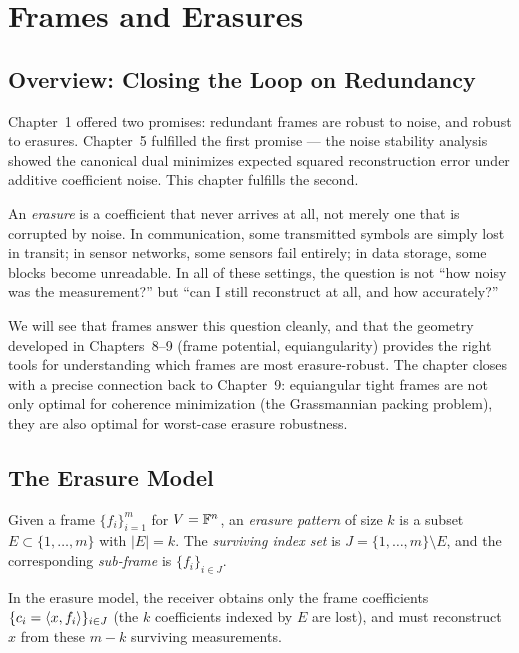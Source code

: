 \chapter{Frames and Erasures}
\label{ch:erasures}

\section{Overview: Closing the Loop on Redundancy}
\label{sec:ch10-overview}

Chapter~1 offered two promises: redundant frames are robust to noise, and
robust to erasures. Chapter~5 fulfilled the first promise --- the noise
stability analysis showed the canonical dual minimizes expected squared
reconstruction error under additive coefficient noise. This chapter
fulfills the second.

An \emph{erasure} is a coefficient that never arrives at all, not merely
one that is corrupted by noise. In communication, some transmitted symbols
are simply lost in transit; in sensor networks, some sensors fail
entirely; in data storage, some blocks become unreadable. In all of these
settings, the question is not ``how noisy was the measurement?'' but
``can I still reconstruct at all, and how accurately?''

We will see that frames answer this question cleanly, and that the
geometry developed in Chapters~8--9 (frame potential, equiangularity)
provides the right tools for understanding which frames are most
erasure-robust. The chapter closes with a precise connection back to
Chapter~9: equiangular tight frames are not only optimal for coherence
minimization (the Grassmannian packing problem), they are also optimal
for worst-case erasure robustness.

\section{The Erasure Model}
\label{sec:erasure-model}

\begin{definition}
\label{def:erasure-pattern}
Given a frame $\{f_i\}_{i=1}^m$ for $V=\mathbb{F}^n$, an \emph{erasure pattern}
of size $k$ is a subset $E\subset\{1,\ldots,m\}$ with $|E|=k$. The
\emph{surviving index set} is $J=\{1,\ldots,m\}\setminus E$, and the
corresponding \emph{sub-frame} is $\{f_i\}_{i\in J}$.

In the erasure model, the receiver obtains only the frame coefficients
$\{c_i=\left\langle x, f_i \right\rangle\}_{i\in J}$ (the $k$ coefficients indexed by $E$
are lost), and must reconstruct $x$ from these $m-k$ surviving
measurements.
\end{definition}

